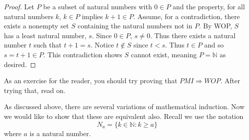 \documentclass[
  twoside,
  12pt,
  letterpaper]{article}
\theoremstyle{definition}
\theoremstyle{plain}
\theoremstyle{plain}
\theoremstyle{definition}
\theoremstyle{definition}
\theoremstyle{remark}
\begin{document}
\begin{proof}

Let \(P\) be a subset of natural numbers with \(0\in P\) and the
property, for all natural numbers \(k\), \(k\in P\) implies
\(k+1\in P\). Assume, for a contradiction, there exists a nonempty set
\(S\) containing the natural numbers not in \(P\). By WOP, \(S\) has a
least natural number, \(s\). Since \(0\in P\), \(s\neq 0\). Thus there
exists a natural number \(t\) such that \(t+1=s\). Notice \(t\not\in S\)
since \(t<s\). Thus \(t\in P\) and so \(s=t+1\in P\). This contradiction
shows \(S\) cannot exist, meaning \(P=\mathbb{N}\) as desired.

\end{proof}

As an exercise for the reader, you should try proving that
\(PMI\Rightarrow WOP\). After trying that, read on.

As discussed above, there are several variations of mathematical
induction. Now we would like to show that these are equivalent also.
Recall we use the notation \begin{equation}
N_a = \{k\in \mathbb{N}: k\geq a\}
\end{equation} where \(a\) is a natural number.


\printbibliography



\thispagestyle{empty}
\end{document}
